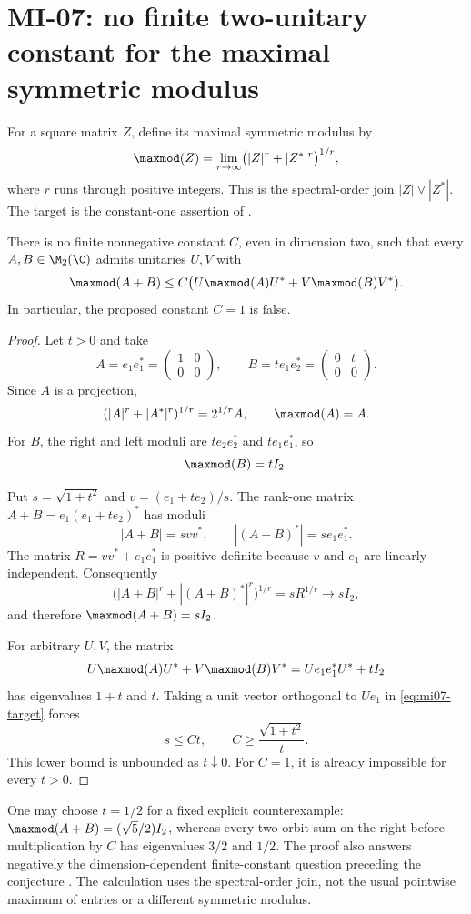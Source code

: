 \section{MI-07: no finite two-unitary constant for the maximal symmetric modulus}
\label{sec:mi07}

For a square matrix $Z$, define its maximal symmetric modulus by
\[
 \maxmod(Z)=\lim_{r\to\infty}\bigl(|Z|^r+|Z^*|^r\bigr)^{1/r},
\]
where $r$ runs through positive integers. This is the spectral-order join $|Z|\vee|Z^*|$. The target is the constant-one assertion of \cite[Conjecture 3.12]{BL2026}.

\begin{theorem}\label{thm:mi07}
There is no finite nonnegative constant $C$, even in dimension two, such that every $A,B\in\M_2(\C)$ admits unitaries $U,V$ with
\begin{equation}\label{eq:mi07-target}
 \maxmod(A+B)\leq C\bigl(U\maxmod(A)U^*+V\maxmod(B)V^*\bigr).
\end{equation}
In particular, the proposed constant $C=1$ is false.
\end{theorem}

\begin{proof}
Let $t>0$ and take
\[
 A=e_1e_1^*=\begin{pmatrix}1&0\\0&0\end{pmatrix},\qquad
 B=te_1e_2^*=\begin{pmatrix}0&t\\0&0\end{pmatrix}.
\]
Since $A$ is a projection,
\[
 (|A|^r+|A^*|^r)^{1/r}=2^{1/r}A,
 \qquad\maxmod(A)=A.
\]
For $B$, the right and left moduli are $te_2e_2^*$ and $te_1e_1^*$, so
\[
 \maxmod(B)=tI_2.
\]

Put $s=\sqrt{1+t^2}$ and $v=(e_1+te_2)/s$. The rank-one matrix $A+B=e_1(e_1+te_2)^*$ has moduli
\[
 |A+B|=svv^*,\qquad |(A+B)^*|=se_1e_1^*.
\]
The matrix $R=vv^*+e_1e_1^*$ is positive definite because $v$ and $e_1$ are linearly independent. Consequently
\[
 \bigl(|A+B|^r+|(A+B)^*|^r\bigr)^{1/r}
 =sR^{1/r}\longrightarrow sI_2,
\]
and therefore $\maxmod(A+B)=sI_2$.

For arbitrary $U,V$, the matrix
\[
 U\maxmod(A)U^*+V\maxmod(B)V^*
 =Ue_1e_1^*U^*+tI_2
\]
has eigenvalues $1+t$ and $t$. Taking a unit vector orthogonal to $Ue_1$ in \eqref{eq:mi07-target} forces
\[
 s\leq Ct,\qquad C\geq\frac{\sqrt{1+t^2}}{t}.
\]
This lower bound is unbounded as $t\downarrow0$. For $C=1$, it is already impossible for every $t>0$.
\end{proof}

\begin{remark}
One may choose $t=1/2$ for a fixed explicit counterexample: $\maxmod(A+B)=(\sqrt5/2)I_2$, whereas every two-orbit sum on the right before multiplication by $C$ has eigenvalues $3/2$ and $1/2$. The proof also answers negatively the dimension-dependent finite-constant question preceding the conjecture \cite[Question 3.11]{BL2026}. The calculation uses the spectral-order join, not the usual pointwise maximum of entries or a different symmetric modulus.
\end{remark}
